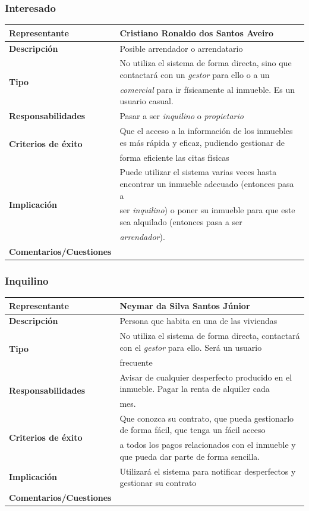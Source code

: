 \documentclass[10pt,a4paper]{article}
\begin{document}
{\footnotesize
\subsubsection*{Interesado}
\begin{tabular}{|l|l|}
\hline
{\small\textbf{Representante}} & Cristiano Ronaldo dos Santos Aveiro \\ \hline
{\small\textbf{Descripción}} & Posible arrendador o arrendatario \\ \hline
\multirow{2}{*}{\small\textbf{Tipo}} & No utiliza el sistema de forma directa, sino que contactará con un \textit{gestor} para ello o a un \\
 & \textit{comercial} para ir físicamente al inmueble. Es un usuario casual. \\ \hline
{\small\textbf{Responsabilidades}} & Pasar a ser \textit{inquilino} o \textit{propietario} \\ \hline
\multirow{2}{*}{\small\textbf{Criterios de éxito}} & Que el acceso a la información de los inmuebles es más rápida y eficaz, pudiendo gestionar de\\
 & forma eficiente las citas físicas \\ \hline
\multirow{3}{*}{\small\textbf{Implicación}} & Puede utilizar el sistema varias veces hasta encontrar un inmueble adecuado (entonces pasa a\\
 & ser \textit{inquilino}) o poner su inmueble para que este sea alquilado (entonces pasa a ser\\
 & \textit{arrendador}).  \\ \hline
{\small\textbf{Comentarios/Cuestiones}} & \\ \hline
\end{tabular}
\subsubsection*{Inquilino}
\begin{tabular}{|l|l|}
\hline
{\small\textbf{Representante}} & Neymar da Silva Santos Júnior \\ \hline
{\small\textbf{Descripción}} & Persona que habita en una de las viviendas \\ \hline
\multirow{2}{*}{\small\textbf{Tipo}} & No utiliza el sistema de forma directa, contactará con el \textit{gestor} para ello. Será un usuario\\
 & frecuente \\ \hline
\multirow{2}{*}{\small\textbf{Responsabilidades}} & Avisar de cualquier desperfecto producido en el inmueble. Pagar la renta de alquiler cada\\
 & mes. \\ \hline
\multirow{2}{*}{{\small\textbf{Criterios de éxito}}} & Que conozca su contrato, que pueda gestionarlo de forma fácil, que tenga un fácil acceso\\
 & a todos los pagos relacionados con el inmueble y que pueda dar parte de forma sencilla.\\ \hline
{\small\textbf{Implicación}} & Utilizará el sistema para notificar desperfectos y gestionar su contrato \\ \hline
{\small\textbf{Comentarios/Cuestiones}} & \\ \hline
\end{tabular}
}
\end{document}
